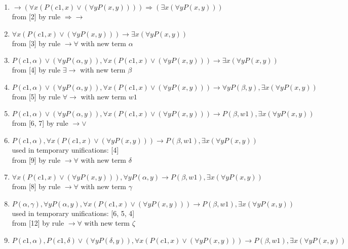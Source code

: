 \begin{enumerate}
\item $ \rightarrow  ( \forall  x (P(c1, x)  \vee  ( \forall  y P(x, y))))  \Rightarrow  ( \exists  x ( \forall  y P(x, y)))$\\
 from [2] by rule $ \Rightarrow \rightarrow $
\item $ \forall  x (P(c1, x)  \vee  ( \forall  y P(x, y))) \rightarrow   \exists  x ( \forall  y P(x, y))$\\
 from [3] by rule $\rightarrow \forall $ with new term $\alpha$
\item $P(c1, \alpha)  \vee  ( \forall  y P(\alpha, y)),  \forall  x (P(c1, x)  \vee  ( \forall  y P(x, y))) \rightarrow   \exists  x ( \forall  y P(x, y))$\\
 from [4] by rule $\exists \rightarrow $ with new term $\beta$
\item $P(c1, \alpha)  \vee  ( \forall  y P(\alpha, y)),  \forall  x (P(c1, x)  \vee  ( \forall  y P(x, y))) \rightarrow   \forall  y P(\beta, y),  \exists  x ( \forall  y P(x, y))$\\
 from [5] by rule $\forall \rightarrow $ with new term $w1$
\item $P(c1, \alpha)  \vee  ( \forall  y P(\alpha, y)),  \forall  x (P(c1, x)  \vee  ( \forall  y P(x, y))) \rightarrow  P(\beta, w1),  \exists  x ( \forall  y P(x, y))$\\
 from [6, 7] by rule $\rightarrow  \vee $
\item $P(c1, \alpha),  \forall  x (P(c1, x)  \vee  ( \forall  y P(x, y))) \rightarrow  P(\beta, w1),  \exists  x ( \forall  y P(x, y))$\\
  used in temporary unifications: [4]\\
 from [9] by rule $\rightarrow \forall $ with new term $\delta$
\item $ \forall  x (P(c1, x)  \vee  ( \forall  y P(x, y))),  \forall  y P(\alpha, y) \rightarrow  P(\beta, w1),  \exists  x ( \forall  y P(x, y))$\\
 from [8] by rule $\rightarrow \forall $ with new term $\gamma$
\item $P(\alpha, \gamma),  \forall  y P(\alpha, y),  \forall  x (P(c1, x)  \vee  ( \forall  y P(x, y))) \rightarrow  P(\beta, w1),  \exists  x ( \forall  y P(x, y))$\\
  used in temporary unifications: [6, 5, 4]\\
 from [12] by rule $\rightarrow \forall $ with new term $\zeta$
\item $P(c1, \alpha), P(c1, \delta)  \vee  ( \forall  y P(\delta, y)),  \forall  x (P(c1, x)  \vee  ( \forall  y P(x, y))) \rightarrow  P(\beta, w1),  \exists  x ( \forall  y P(x, y))$\\

\end{enumerate}

